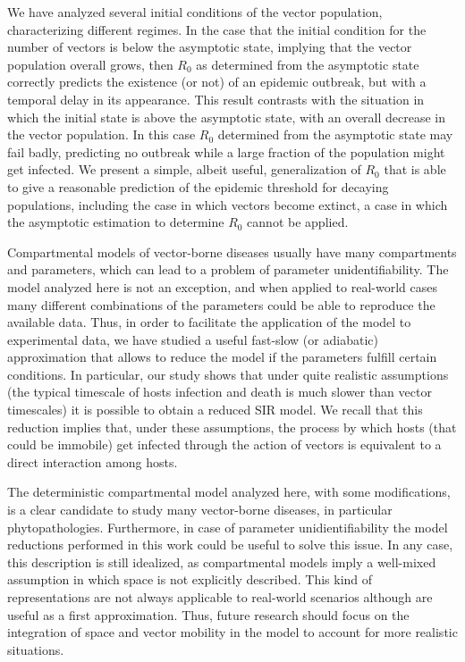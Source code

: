 We have analyzed several initial conditions of the vector population,
characterizing different regimes. In the case that the initial condition for
the number of vectors is below the asymptotic state, implying that the vector
population overall grows, then $R_0$ as determined from the asymptotic state
correctly predicts the existence (or not) of an epidemic outbreak, but with a
temporal delay in its appearance. This result contrasts with the situation in
which the initial state is above the asymptotic state, with an overall decrease
in the vector population. In this case $R_0$ determined from the asymptotic
state may fail badly, predicting no outbreak while a large fraction of the
population might get infected. We present a simple, albeit useful,
generalization of $R_0$ that is able to give a reasonable prediction of the
epidemic threshold for decaying populations, including the case in which
vectors become extinct, a case in which the asymptotic estimation to determine
$R_0$ cannot be applied.

Compartmental models of vector-borne diseases usually have many
compartments and parameters, which can lead to a problem of parameter
unidentifiability. The model analyzed here is not an exception, and when
applied to real-world cases many different combinations of the parameters could
be able to reproduce the available data. Thus, in order to facilitate the
application of the model to experimental data, we have studied a useful
fast-slow (or adiabatic) approximation that allows to reduce the model if the
parameters fulfill certain conditions. In particular, our study shows that
under quite realistic assumptions (the typical timescale of hosts infection and
death is much slower than vector timescales) it is possible to obtain a reduced
SIR model. We recall that this reduction implies that, under these assumptions,
the process by which hosts (that could be immobile) get infected through the
action of vectors is equivalent to a direct interaction among hosts.

The deterministic compartmental model analyzed here, with some
modifications, is a clear candidate to study many vector-borne diseases, in
particular phytopathologies. Furthermore, in case of parameter
unidientifiability the model reductions performed in this work could be useful
to solve this issue. In any case, this description is still idealized, as
compartmental models imply a well-mixed assumption in which space is not
explicitly described. This kind of representations are not always applicable to
real-world scenarios although are useful as a first approximation. Thus, future
research should focus on the integration of space and vector mobility in the
model to account for more realistic situations.